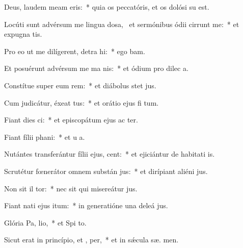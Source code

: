 \item Deus, laudem meam  eris:~* quia os peccatóris, et os dolósi su   est.
\item Locúti sunt advérsum me lingua dosa,~\pscross{} et sermónibus ódii cirrunt me:~* et expugna  tis.
\item Pro eo ut me dilígerent, detra hi:~* ego  bam.
\item Et posuérunt advérsum me ma  nis:~* et ódium pro dilec a.
\item Constítue super eum rem:~* et diábolus stet   jus.
\item Cum judicátur, éxeat tus:~* et orátio ejus fi  tum.
\item Fiant dies  ci:~* et episcopátum ejus ac ter.
\item Fiant fílii  phani:~* et u  a.
\item Nutántes transferántur fílii ejus,  cent:~* et ejiciántur de habitati is.
\item Scrutétur fœnerátor omnem substán jus:~* et dirípiant aliéni  jus.
\item Non sit il tor:~* nec sit qui misereátur  jus.
\item Fiant nati ejus  itum:~* in generatióne una deleá  jus.
\item Glória Pa,  lio,~* et Spi to.
\item Sicut erat in princípio, et ,  per,~* et in sǽcula sæ. men.
